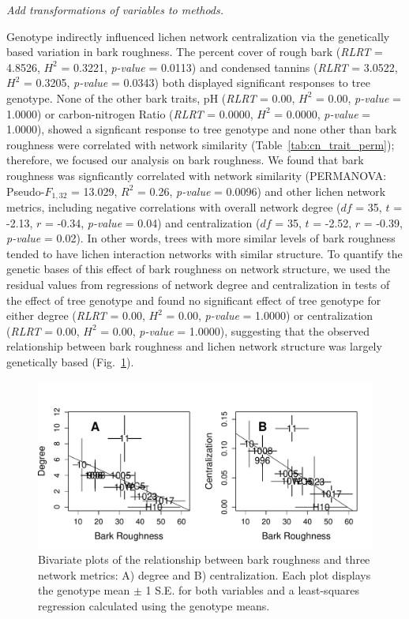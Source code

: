\documentclass[11pt,twocolumn,twoside,lineno]{pnas-new}
\begin{document}
\textit{Add transformations of variables to methods.}

Genotype indirectly influenced lichen network centralization via the
genetically based variation in bark roughness. The percent cover of
rough bark (\textit{RLRT} = 4.8526, $H^2$ = 0.3221, \textit{p-value} =
0.0113) and condensed tannins (\textit{RLRT} = 3.0522, $H^2$ = 0.3205,
\textit{p-value} = 0.0343) both displayed significant responses to
tree genotype. None of the other bark traits, pH (\textit{RLRT} =
0.00, $H^2$ = 0.00, \textit{p-value} = 1.0000) or carbon-nitrogen
Ratio (\textit{RLRT} = 0.0000, $H^2$ = 0.0000, \textit{p-value} =
1.0000), showed a signficant response to tree genotype and none other
than bark roughness were correlated with network similarity
(Table~\ref{tab:cn_trait_perm}); therefore, we focused
our analysis on bark roughness. We found that bark roughness was
signficantly correlated with network similarity (PERMANOVA:
Pseudo-$F_{1,32}$ = 13.029, $R^2$ = 0.26, \textit{p-value} = 0.0096)
and other lichen network metrics, including negative correlations with
overall network degree ($df$ = 35, $t$ = -2.13, $r$ = -0.34,
\textit{p-value} = 0.04) and centralization ($df$ = 35, $t$ = -2.52,
$r$ = -0.39, \textit{p-value} = 0.02). In other words, trees with more
similar levels of bark roughness tended to have lichen interaction
networks with similar structure. To quantify the genetic bases of this
effect of bark roughness on network structure, we used the residual
values from regressions of network degree and centralization in tests
of the effect of tree genotype and found no significant effect of tree
genotype for either degree (\textit{RLRT} = 0.00, $H^2$ = 0.00,
\textit{p-value} = 1.0000) or centralization (\textit{RLRT} = 0.00,
$H^2$ = 0.00, \textit{p-value} = 1.0000), suggesting that the observed
relationship between bark roughness and lichen network structure was
largely genetically based (Fig.~\ref{fig:br_net}).



\begin{figure}[ht]
\centering
\includegraphics[width=\linewidth]{br_net.pdf}
\caption{Bivariate plots of the relationship between bark roughness
  and three network metrics: A) degree and B) centralization. Each
  plot displays the genotype mean $\pm$ 1 S.E. for both variables and
  a least-squares regression calculated using the genotype means.}
\label{fig:br_net}
\end{figure}
\end{document}
